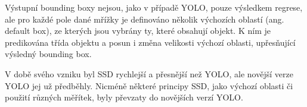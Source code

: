 Výstupní bounding boxy nejsou, jako v případě YOLO, pouze výsledkem regrese,
ale pro každé pole dané mřížky je definováno několik výchozích oblastí (ang.
default box), ze kterých jsou vybrány ty, které obsahují objekt. K ním je
predikována třída objektu a posun i změna velikosti výchozí oblasti,
upřesňující výsledný bounding box.

V době svého vzniku byl SSD rychlejší a přesnější než YOLO, ale novější verze
YOLO jej už předběhly. Nicméně některé principy SSD, jako výchozí oblasti či
použití různých měřítek, byly převzaty do novějších verzí YOLO.


\endinput